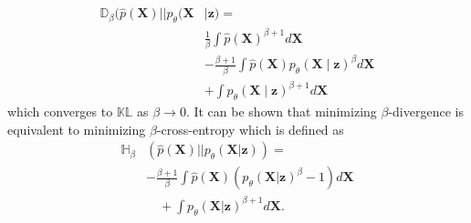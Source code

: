 \documentclass{article}
\def\bX{\mathbf{X}}
\def\bz{\mathbf{z}}
\theoremstyle{plain}
\theoremstyle{definition}
\begin{document}
\begin{equation}
\begin{split}
\mathbb{D}_{\beta}(\hat{p}(\bX) ||  p_{\theta} (\bX & \mid \bz) = \\
 & \frac{1}{\beta} \int \hat{p}(\bX)^{\beta + 1} d \bX \\
&  - \frac{\beta + 1}{\beta} \int \hat{p}(\bX) p_{\theta}(\bX \mid \bz)^{\beta} d \bX \\
&  + \int p_{\theta}(\bX \mid \bz)^{\beta + 1} d \bX
\end{split}
\end{equation}
which converges to $\mathbb{KL}$ as $\beta \rightarrow 0$.  It can be shown that minimizing $\beta$-divergence is equivalent to minimizing $\beta$-cross-entropy \cite{eguchi2010entropy, futami2017variational} which is defined as
\begin{equation}
\begin{split}
\mathbb{H}_{\beta} & (\hat{p}(\bX) || p_{\theta}(\bX | \bz)) = \\
& - \frac{\beta + 1}{\beta} \int \hat{p}(\bX) \left(p_{\theta}(\bX | \bz)^{\beta}-1 \right) d \bX  \\ 
& \quad + \int p_{\theta}(\bX| \bz)^{\beta + 1} d \bX.
\end{split}
\label{eqn:beta_entropy}
\end{equation}
\end{document}
